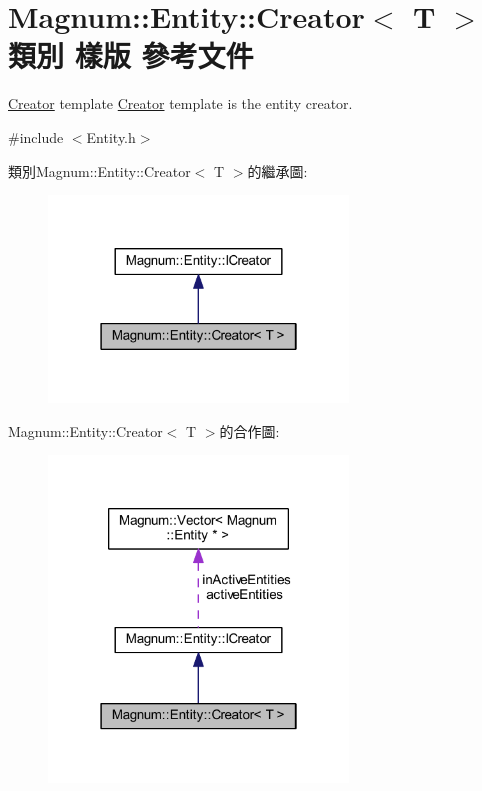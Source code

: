 \hypertarget{class_magnum_1_1_entity_1_1_creator}{}\section{Magnum\+:\+:Entity\+:\+:Creator$<$ T $>$ 類別 樣版 參考文件}
\label{class_magnum_1_1_entity_1_1_creator}


\hyperlink{class_magnum_1_1_entity_1_1_creator}{Creator} template \hyperlink{class_magnum_1_1_entity_1_1_creator}{Creator} template is the entity creator.  




{\ttfamily \#include $<$Entity.\+h$>$}



類別\+Magnum\+:\+:Entity\+:\+:Creator$<$ T $>$的繼承圖\+:\nopagebreak
\begin{figure}[H]
\begin{center}
\leavevmode
\includegraphics[width=226pt]{class_magnum_1_1_entity_1_1_creator__inherit__graph}
\end{center}
\end{figure}


Magnum\+:\+:Entity\+:\+:Creator$<$ T $>$的合作圖\+:\nopagebreak
\begin{figure}[H]
\begin{center}
\leavevmode
\includegraphics[width=226pt]{class_magnum_1_1_entity_1_1_creator__coll__graph}
\end{center}
\end{figure}
